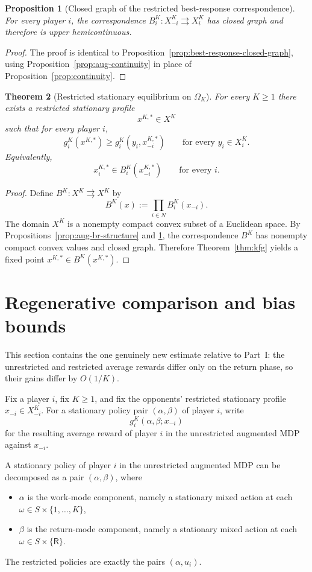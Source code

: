 \documentclass[11pt]{article}
\newtheorem{theorem}{Theorem}[section]
\newtheorem{proposition}[theorem]{Proposition}
\theoremstyle{definition}
\newcommand{\1}{\mathbf{1}}
\begin{document}
\begin{proposition}[Closed graph of the restricted best-response correspondence]\label{prop:aug-br-closed}
For every player $i$, the correspondence $B_i^K:X_{-i}^K\rightrightarrows X_i^K$ has closed graph and therefore is upper hemicontinuous.
\end{proposition}

\begin{proof}
The proof is identical to Proposition~\ref{prop:best-response-closed-graph}, using Proposition~\ref{prop:aug-continuity} in place of Proposition~\ref{prop:continuity}.
\end{proof}

\begin{theorem}[Restricted stationary equilibrium on $\Omega_K$]\label{thm:aug-eq}
For every $K\ge1$ there exists a restricted stationary profile
\[
x^{K,*}\in X^K
\]
such that for every player $i$,
\[
g_i^K(x^{K,*})\ge g_i^K(y_i,x_{-i}^{K,*})\qquad\text{for every }y_i\in X_i^K.
\]
Equivalently,
\[
x_i^{K,*}\in B_i^K(x_{-i}^{K,*})\qquad\text{for every }i.
\]
\end{theorem}

\begin{proof}
Define $B^K:X^K\rightrightarrows X^K$ by
\[
B^K(x):=\prod_{i\in N}B_i^K(x_{-i}).
\]
The domain $X^K$ is a nonempty compact convex subset of a Euclidean space. By Propositions~\ref{prop:aug-br-structure} and \ref{prop:aug-br-closed}, the correspondence $B^K$ has nonempty compact convex values and closed graph. Therefore Theorem~\ref{thm:kfg} yields a fixed point $x^{K,*}\in B^K(x^{K,*})$.
\end{proof}

\section{Regenerative comparison and bias bounds}\label{sec:regenerative}

This section contains the one genuinely new estimate relative to Part~I: the unrestricted and restricted average rewards differ only on the return phase, so their gains differ by $O(1/K)$.

Fix a player $i$, fix $K\ge1$, and fix the opponents' restricted stationary profile $x_{-i}\in X_{-i}^K$. For a stationary policy pair $(\alpha,\beta)$ of player $i$, write
\[
g_i^K(\alpha,\beta;x_{-i})
\]
for the resulting average reward of player $i$ in the unrestricted augmented MDP against $x_{-i}$.

A stationary policy of player $i$ in the unrestricted augmented MDP can be decomposed as a pair $(\alpha,\beta)$, where
\begin{itemize}[leftmargin=2.4em]
\item $\alpha$ is the work-mode component, namely a stationary mixed action at each $\omega\in S\times\{1,\dots,K\}$,
\item $\beta$ is the return-mode component, namely a stationary mixed action at each $\omega\in S\times\{\mathsf R\}$.
\end{itemize}
The restricted policies are exactly the pairs $(\alpha,u_i)$.
\end{document}
